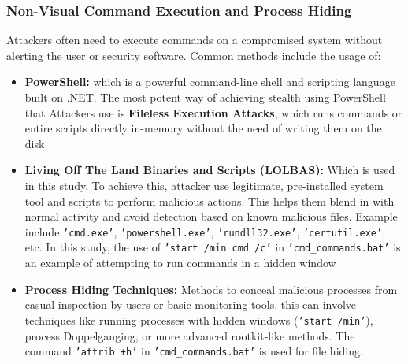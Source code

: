 \documentclass[11pt]{article}
\begin{document}
				\subsubsection{Non-Visual Command Execution and Process Hiding}
					Attackers often need to execute commands on a compromised system without alerting the user or security software. Common methods include the usage of:
					\begin{itemize}
						\item \textbf{PowerShell:} which is a powerful command-line shell and scripting language built on .NET. The most potent way of achieving stealth using PowerShell that Attackers use is \textbf{Fileless Execution Attacks}, which runs commands or entire scripts directly in-memory without the need of writing them on the disk
						\item \textbf{Living Off The Land Binaries and Scripts (LOLBAS):} Which is used in this study. To achieve this, attacker use legitimate, pre-installed system tool and scripts to perform malicious actions. This helps them blend in with normal activity and avoid detection based on known malicious files. Example include \texttt{'cmd.exe'}, \texttt{'powershell.exe'}, \texttt{'rundll32.exe'}, \texttt{'certutil.exe'}, etc.
						In this study, the use of \texttt{'start /min cmd /c'} in \texttt{'cmd\_commands.bat'} is an example of attempting to run commands in a hidden window
						\item \textbf{Process Hiding Techniques:} Methods to conceal malicious processes from casual inspection by users or basic monitoring tools. this can involve techniques like running processes with hidden windows (\texttt{'start /min'}), process Doppelganging, or more advanced rootkit-like methods. The command \texttt{'attrib +h'} in \texttt{'cmd\_commands.bat'} is used for file hiding.
					\end{itemize}
\end{document}
